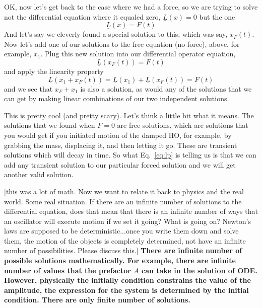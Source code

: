 \documentclass[]{revtex4}
\newcommand{\st}[1]{{\color{red}\bfseries #1}}
\begin{document}
OK, now let's get back to the case where we had a force, so we are trying to solve not the differential equation where it equaled zero, $\underline{L}(x)=0$
but the one
\st{
  \begin{equation}
    \underline{L}(x) = F(t)
  \end{equation}
}
And let's say we cleverly found a special solution to this, which was say, $x_F(t)$.  Now let's add one of our solutions to the free equation (no force),
above, for example, $x_1$.  Plug this new solution into our differential operator equation,
\st{
  \begin{equation}
    \underline{L}(x_F(t)) = F(t)
  \end{equation}
}
and apply the linearity property
\st{
  \begin{equation}\label{eq:lp}
    \underline{L}(x_1 + x_F(t)) = \underline{L}(x_1) + \underline{L}(x_F(t)) = F(t)
  \end{equation}
}
and we see that $x_F+x_1$ is also a solution, as would any of the solutions that we can get
by making linear combinations of our two independent solutions.

This is pretty cool (and pretty scary).  Let's think a little bit what it means.  The
solutions that we found when $F=0$ are free solutions, which are solutions that you would
get if you initiated motion of the damped HO, for example, by grabbing the mass, displacing
it, and then letting it go.  These are transient solutions which will decay in time.  So
what Eq.~\eqref{eq:lp} is telling us is that we can add any transient solution to our
particular forced solution and we will get another valid solution.

  [this was a lot of math.  Now we want to relate it back to physics and the real world.
    Some real situation.  If there are an infinite number of solutions to the differential
    equation, does that mean that there is an infinite number of ways that an oscillator
    will execute motion if we set it going?  What is going on? Newton's laws are supposed to
    be deterministic...once you write them down and solve them, the motion of the objects is
    completely determined, not have an infinite number of possibilities. Please discuss
    this.]
\st{
  There are infinite number of possible solutions mathematically. For example,  there are infinite number of values that the prefactor $A$ can take in the solution of ODE. However, physically the initially condition constrains the value of the amplitude, the expression for the system is determined by the initial condition. There are only finite number of solutions.
}
\end{document}
